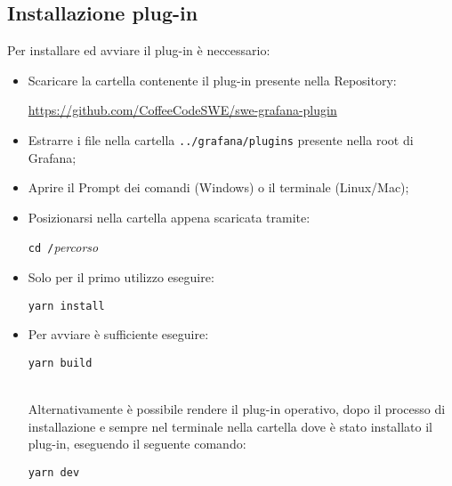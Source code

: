 \documentclass[../manuale-utente.tex]{subfiles}
\begin{document}
\subsection{Installazione plug-in}%
\label{subs:installazione-plug-in}
Per installare ed avviare il plug-in è neccessario:
\begin{itemize}
  \item Scaricare la cartella contenente il plug-in presente nella Repository: \\
  \centerline{\url{https://github.com/CoffeeCodeSWE/swe-grafana-plugin}}
  \item Estrarre i file nella cartella \texttt{../grafana/plugins} presente nella root di Grafana;
  \item Aprire il Prompt dei comandi (Windows) o il terminale (Linux/Mac);
  \item Posizionarsi nella cartella appena scaricata tramite: \\
  \centerline{\texttt{cd /}\textit{percorso}}
  \item Solo per il primo utilizzo eseguire: \\
  \centerline{\texttt{yarn install}}
  \item Per avviare è sufficiente eseguire: \\
  \centerline{\texttt{yarn build}} \\
  \newline
  Alternativamente è possibile rendere il plug-in operativo, dopo il processo di installazione e sempre nel terminale nella cartella dove è stato installato il plug-in, eseguendo il seguente comando: \\
  \newline
  \centerline{\texttt{yarn dev}}
\end{itemize}
\end{document}
